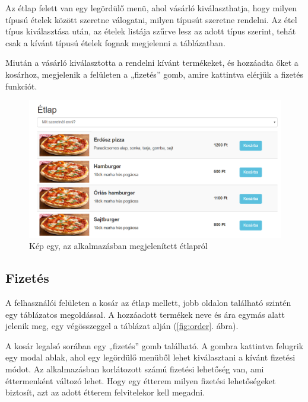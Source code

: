 Az étlap felett van egy legördülő menü, ahol vásárló kiválaszthatja, hogy milyen típusú ételek között szeretne válogatni, milyen típusút szeretne rendelni. Az étel típus kiválasztása után, az ételek listája szűrve lesz az adott típus szerint, tehát csak a kívánt típusú ételek fognak megjelenni a táblázatban.

Miután a vásárló kiválasztotta a rendelni kívánt termékeket, és hozzáadta őket a kosárhoz, megjelenik a felületen a „fizetés” gomb, amire kattintva elérjük a fizetés funkciót.

\begin{figure}
\centering
\includegraphics[scale=0.5]{kepek/menu.png}
\caption{Kép egy, az alkalmazásban megjelenített étlapról}
\label{fig:menu}
\end{figure}

\subsection{Fizetés}

A felhasználói felületen a kosár az étlap mellett, jobb oldalon található szintén egy táblázatos megoldással. A hozzáadott termékek neve és ára egymás alatt jelenik meg, egy végösszeggel a táblázat alján (\ref{fig:order}. ábra).

A kosár legalsó sorában egy „fizetés” gomb található. A gombra kattintva felugrik egy modal ablak, ahol egy legördülő menüből lehet kiválasztani a kívánt fizetési módot. Az alkalmazásban korlátozott számú fizetési lehetőség van, ami éttermenként változó lehet. Hogy egy étterem milyen fizetési lehetőségeket biztosít, azt az adott étterem felvitelekor kell megadni.

